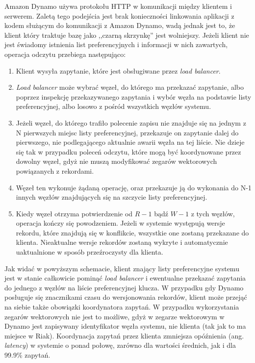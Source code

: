 Amazon Dynamo używa protokołu HTTP w komunikacji między klientem i serwerem.
Zaletą tego podejścia jest brak konieczności linkowania aplikacji z kodem służącym do komunikacji z Amazon Dynamo, wadą jednak jest to, że klient który traktuje bazę jako ,,czarną skrzynkę'' jest wolniejszy.
Jeżeli klient nie jest świadomy istnienia list preferencyjnych i informacji w nich zawartych, operacja odczytu przebiega następująco: 
\begin{enumerate}
 \item Klient wysyła zapytanie, które jest obsługiwane przez \emph{load balancer}.
 \item \emph{Load balancer} może wybrać węzeł, do którego ma przekazać zapytanie, albo poprzez inspekcję przekazywanego zapytania i wybór węzła na podstawie listy preferencyjnej, albo losowo z pośród wszystkich węzłów systemu.
 \item Jeżeli węzeł, do którego trafiło polecenie zapisu nie znajduje się na jednym z N pierwszych miejsc listy preferencyjnej, przekazuje on zapytanie dalej do pierwszego, nie podlegającego aktualnie awarii węzła na tej liście.
 Nie dzieje się tak w przypadku poleceń odczytu, które mogą być koordynowane przez dowolny węzeł, gdyż nie muszą modyfikować zegarów wektorowych powiązanych z rekordami.
 \item Węzeł ten wykonuje żądaną operację, oraz przekazuje ją do wykonania do N-1 innych węzłów znajdujących się na szczycie listy preferencyjnej.
 \item Kiedy węzeł otrzyma potwierdzenie od $R-1$ bądź $W-1$ z tych węzłów, operacja kończy się powodzeniem.
 Jeżeli w systemie występują wersje rekordu, które znajdują się w konflikcie, wszystkie one zostaną przekazane do klienta.
 Nieaktualne wersje rekordów zostaną wykryte i automatycznie uaktualnione w sposób przeźroczysty dla klienta.
\end{enumerate}

Jak widać w powyższym schemacie, klient znający listy preferencyjne systemu jest w stanie całkowicie pominąć \emph{load balancer} i ewentualne przekazać zapytania do jednego z węzłów na liście preferencyjnej klucza. 
W przypadku gdy Dynamo posługuje się znacznikami czasu do wersjonowania rekordów, klient może przejąć na siebie także obowiązki koordynatora zapytań.
W przypadku wykorzystania zegarów wektorowych nie jest to możliwe, gdyż w zegarze wektorowym w Dynamo jest zapisywany identyfikator węzła systemu, nie klienta (tak jak to ma miejsce w Riak).
Koordynacja zapytań przez klienta zmniejsza opóźnienia (ang. \emph{latency}) w systemie o ponad połowę, zarówno dla wartości średnich, jak i dla 99.9\% zapytań.

